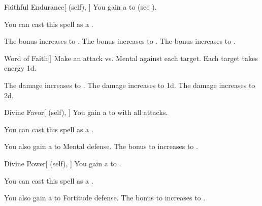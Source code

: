 \lowercase{\hypertarget{spell:Faithful Endurance}{}}\label{spell:Faithful Endurance}
\begin{attuneability}[Rank 1]{\hypertarget{spell:Faithful Endurance}{Faithful Endurance}}[ (self), ]
You gain a   to  (see ).

You can cast this spell as a .

\rankline
{} The bonus increases to .
 The bonus increases to .
 The bonus increases to .
\end{attuneability}
\vspace{0.25em}



\lowercase{\hypertarget{spell:Word of Faith}{}}\label{spell:Word of Faith}
\begin{freeability}[Rank 1]{\hypertarget{spell:Word of Faith}{Word of Faith}}[]
Make an attack vs. Mental against each target.
\hit Each target takes energy  \minus1d.

\rankline
{} The damage increases to .
 The damage increases to  \plus1d.
 The damage increases to  \plus2d.
\end{freeability}
\vspace{0.25em}



\lowercase{\hypertarget{spell:Divine Favor}{}}\label{spell:Divine Favor}
\begin{attuneability}[Rank 3]{\hypertarget{spell:Divine Favor}{Divine Favor}}[ (self), ]
You gain a   to  with all attacks.

You can cast this spell as a .

\rankline
{} You also gain a   to Mental defense.
 The bonus to  increases to .
\end{attuneability}
\vspace{0.25em}



\lowercase{\hypertarget{spell:Divine Power}{}}\label{spell:Divine Power}
\begin{attuneability}[Rank 3]{\hypertarget{spell:Divine Power}{Divine Power}}[ (self), ]
You gain a   to .

You can cast this spell as a .

\rankline
{} You also gain a   to Fortitude defense.
 The bonus to  increases to .
\end{attuneability}
\vspace{0.25em}



